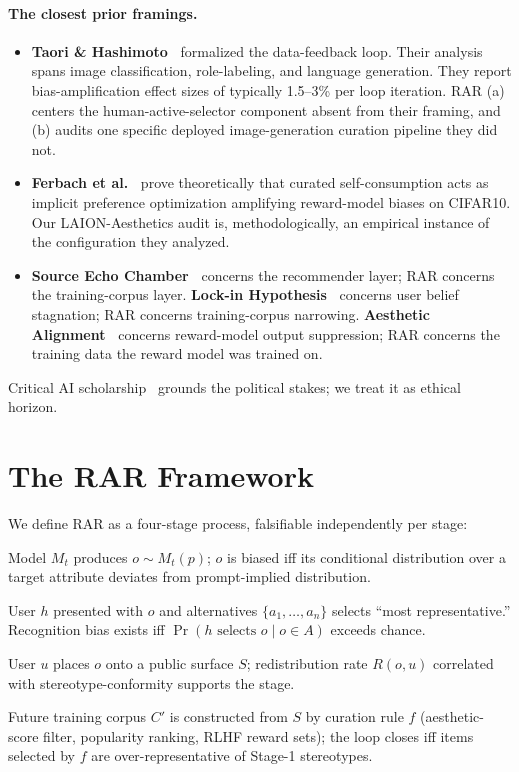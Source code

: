 \documentclass[manuscript, nonacm, screen, review]{acmart}
\begin{document}
\paragraph{The closest prior framings.}
\begin{itemize}
\item \textbf{Taori \& Hashimoto~\cite{taori2022data}} formalized the data-feedback loop. Their analysis spans image classification, role-labeling, and language generation. They report bias-amplification effect sizes of typically 1.5--3\% per loop iteration. RAR (a) centers the human-active-selector component absent from their framing, and (b) audits one specific deployed image-generation curation pipeline they did not.
\item \textbf{Ferbach et al.~\cite{ferbach2024selfconsuming}} prove theoretically that curated self-consumption acts as implicit preference optimization amplifying reward-model biases on CIFAR10. Our LAION-Aesthetics audit is, methodologically, an empirical instance of the configuration they analyzed.
\item \textbf{Source Echo Chamber~\cite{zhou2024source}} concerns the recommender layer; RAR concerns the training-corpus layer. \textbf{Lock-in Hypothesis~\cite{qiu2025lockin}} concerns user belief stagnation; RAR concerns training-corpus narrowing. \textbf{Aesthetic Alignment~\cite{guo2025aesthetic}} concerns reward-model output suppression; RAR concerns the training data the reward model was trained on.
\end{itemize}

Critical AI scholarship~\cite{crawford2021atlas,buolamwini2018gender,dignazio2020data,noble2018algorithms,benjamin2019race} grounds the political stakes; we treat it as ethical horizon.

\section{The RAR Framework}
\label{sec:framework}

We define RAR as a four-stage process, falsifiable independently per stage:
\begin{description}\itemsep0pt
\item[Stage 1 --- Generation.] Model $M_t$ produces $o\!\sim\!M_t(p)$; $o$ is biased iff its conditional distribution over a target attribute deviates from prompt-implied distribution.
\item[Stage 2 --- Recognition.] User $h$ presented with $o$ and alternatives $\{a_1,\dots,a_n\}$ selects ``most representative.'' Recognition bias exists iff $\Pr(h\text{ selects }o\mid o\!\in\!A)$ exceeds chance.
\item[Stage 3 --- Redistribution.] User $u$ places $o$ onto a public surface $S$; redistribution rate $R(o,u)$ correlated with stereotype-conformity supports the stage.
\item[Stage 4 --- Reingestion.] Future training corpus $C'$ is constructed from $S$ by curation rule $f$ (aesthetic-score filter, popularity ranking, RLHF reward sets); the loop closes iff items selected by $f$ are over-representative of Stage-1 stereotypes.
\end{description}
\end{document}
